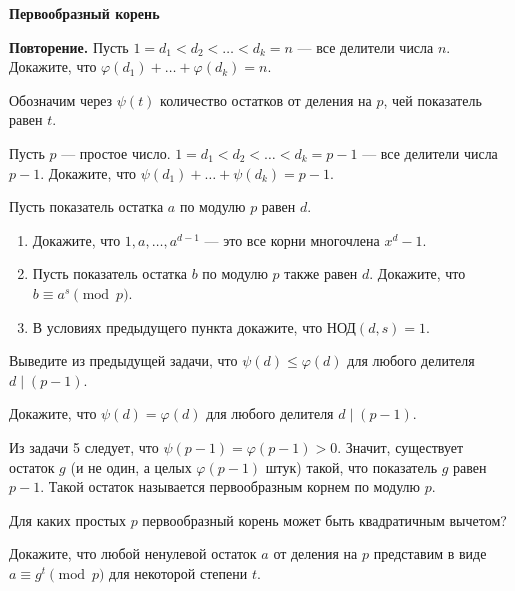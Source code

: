 \documentclass{article}
\begin{document}
    \large

    \begin{center}
        \textbf{Первообразный корень}
    \end{center}

    \begin{enumerate_boxed}

        \item \textbf{Повторение.} Пусть $1 = d_1 < d_2 < \ldots < d_k = n$ — все делители числа $n$.
        Докажите, что $\varphi(d_1) + \ldots + \varphi(d_k) = n$.

        Обозначим через $\psi(t)$ количество остатков от деления на $p$, чей показатель равен $t$.

        \item Пусть $p$ — простое число. $1 = d_1 < d_2 < \ldots < d_k = p - 1$ — все делители числа $p - 1$.
        Докажите, что $\psi(d_1) + \ldots + \psi(d_k) = p - 1$.

        \item Пусть показатель остатка $a$ по модулю $p$ равен $d$.

        \begin{enumerate}
            \item Докажите, что $1, a, \ldots, a^{d-1}$ — это все корни многочлена $x^d - 1$.
            \item Пусть показатель остатка $b$ по модулю $p$ также равен $d$.
            Докажите, что $b \equiv a^s \pmod{p}$.
            \item В условиях предыдущего пункта докажите, что $\text{НОД}(d, s) = 1$.
        \end{enumerate}

        \item Выведите из предыдущей задачи, что $\psi(d) \leqslant \varphi(d)$ для любого делителя $d \mid (p - 1)$.

        \item Докажите, что $\psi(d) = \varphi(d)$ для любого делителя $d \mid (p - 1)$.

        Из задачи 5 следует, что $\psi(p - 1) = \varphi(p - 1) > 0$.
        Значит, существует остаток $g$ (и не один, а целых $\varphi(p - 1)$ штук) такой, что показатель $g$ равен $p - 1$.
        Такой остаток называется первообразным корнем по модулю $p$.

        \item Для каких простых $p$ первообразный корень может быть квадратичным вычетом?

        \item Докажите, что любой ненулевой остаток $a$ от деления на $p$ представим в виде $a \equiv g^t \pmod{p}$ для некоторой степени $t$.


\end{enumerate_boxed}
\end{document}

